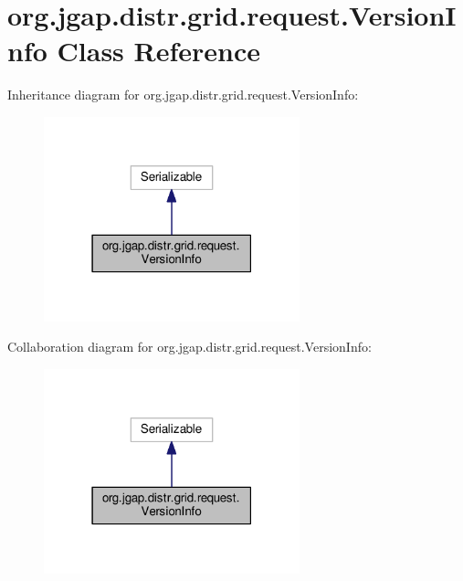 \hypertarget{classorg_1_1jgap_1_1distr_1_1grid_1_1request_1_1_version_info}{\section{org.\-jgap.\-distr.\-grid.\-request.\-Version\-Info Class Reference}
\label{classorg_1_1jgap_1_1distr_1_1grid_1_1request_1_1_version_info}
}


Inheritance diagram for org.\-jgap.\-distr.\-grid.\-request.\-Version\-Info\-:
\nopagebreak
\begin{figure}[H]
\begin{center}
\leavevmode
\includegraphics[width=210pt]{classorg_1_1jgap_1_1distr_1_1grid_1_1request_1_1_version_info__inherit__graph}
\end{center}
\end{figure}


Collaboration diagram for org.\-jgap.\-distr.\-grid.\-request.\-Version\-Info\-:
\nopagebreak
\begin{figure}[H]
\begin{center}
\leavevmode
\includegraphics[width=210pt]{classorg_1_1jgap_1_1distr_1_1grid_1_1request_1_1_version_info__coll__graph}
\end{center}
\end{figure}
